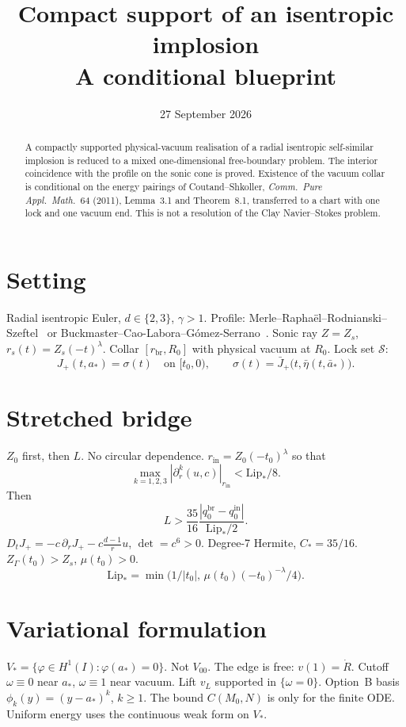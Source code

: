 \documentclass{amsart}
\title[Compact support of an isentropic implosion]{Compact support of an isentropic implosion\\
{\large A conditional blueprint}}
\author{}
\date{27 September 2026}
\theoremstyle{plain}
\theoremstyle{definition}
\begin{document}
\begin{abstract}
A compactly supported physical-vacuum realisation of a radial isentropic
self-similar implosion is reduced to a mixed one-dimensional free-boundary
problem. The interior coincidence with the profile on the sonic cone is
proved. Existence of the vacuum collar is conditional on the energy pairings
of Coutand--Shkoller, \emph{Comm.\ Pure Appl.\ Math.}\ 64 (2011),
Lemma~3.1 and Theorem~8.1, transferred to a chart with one lock and one
vacuum end. This is not a resolution of the Clay Navier--Stokes problem.
\end{abstract}

\maketitle
\enlargethispage{6pt}

\section{Setting}
Radial isentropic Euler, $d\in\{2,3\}$, $\gamma>1$.
Profile: Merle--Rapha\"el--Rodnianski--Szeftel~\cite{MRRS2022}
or Buckmaster--Cao-Labora--G\'omez-Serrano~\cite{BCLGS2025}.
Sonic ray $Z=Z_s$, $r_s(t)=Z_s(-t)^\lambda$.
Collar $[r_{\mathrm{br}},R_0]$ with physical vacuum at $R_0$.
Lock set $\mathcal{S}$:
\[
J_+(t,a_*)=\sigma(t)\quad\text{on }[t_0,0),\qquad
\sigma(t)=\bar J_+\bigl(t,\bar\eta(t,\bar a_*)\bigr).
\]

\section{Stretched bridge}
$Z_0$ first, then $L$. No circular dependence.
$r_{\mathrm{in}}=Z_0(-t_0)^\lambda$ so that
\[
\max_{k=1,2,3}|\partial_r^k(u,c)|_{r_{\mathrm{in}}}<\mathrm{Lip}_*/8.
\]
Then
\[
L>\frac{35}{16}\frac{|q_0^{\mathrm{br}}-q_0^{\mathrm{in}}|}{\mathrm{Lip}_*/2}.
\]
$D_t J_+=-c\,\partial_r J_+-c\frac{d-1}{r}u$, $\det=c^6>0$.
Degree-7 Hermite, $C_*=35/16$.
$Z_\Gamma(t_0)>Z_s$, $\mu(t_0)>0$.
\[
\mathrm{Lip}_*=\min\bigl(1/|t_0|,\,\mu(t_0)(-t_0)^{-\lambda}/4\bigr).
\]

\section{Variational formulation}
$V_*=\{\varphi\in H^1(I):\varphi(a_*)=0\}$.
Not $V_{00}$. The edge is free: $v(1)=\dot R$.
Cutoff $\omega\equiv0$ near $a_*$, $\omega\equiv1$ near vacuum.
Lift $v_L$ supported in $\{\omega=0\}$.
Option~B basis $\phi_k(y)=(y-a_*)^k$, $k\ge1$.
The bound $C(M_0,N)$ is only for the finite ODE.
Uniform energy uses the continuous weak form on $V_*$.
\end{document}
